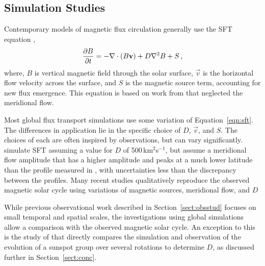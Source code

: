 \subsection{Simulation Studies}

Contemporary models of magnetic flux circulation generally use the \gls{SFT} equation \citep{Devore:1984,Sheeley:1985},
\begin{equation}\label{eqn:sft}
\frac{\partial B}{\partial t}=-\nabla \cdot (B \vec{v}) + D \nabla^2 B + S \mbox{\,,}
\end{equation}
where, $B$ is vertical magnetic field through the solar surface, $\vec{v}$ is the horizontal flow velocity across the surface, and $S$ is the magnetic source term, accounting for new flux emergence. This equation is based on work from \cite{Leighton:1964} that neglected the meridional flow. %

Most global flux transport simulations use some variation of Equation~\ref{eqn:sft}. The differences in application lie in the specific choice of $D$, $\vec{v}$, and $S$. The choices of each are often inspired by observations, but can vary significantly.
\cite{Wang:2009} simulate \gls{SFT} assuming a value for $D$ of 500\,km$^2$s$^{-1}$, but assume a meridional flow amplitude that has a higher amplitude and peaks at a much lower latitude than the profile measured in \cite{Hathaway:2011}, with uncertainties less than the discrepancy between the profiles. 
Many recent studies qualitatively reproduce the observed magnetic solar cycle using variations of magnetic sources, meridional flow, and $D$ \citep{Wang:1989,Dikpati:2004,Schrijver:2008b}

While previous observational work described in Section~\ref{sect:obsstud} focuses on small temporal and spatial scales, the investigations using global simulations allow a comparison with the observed magnetic solar cycle. %
An exception to this is the study of \cite{Wang:1989} that directly compares the simulation and observation of the evolution of a sunspot group over several rotations to determine $D$, as discussed further in Section~\ref{sect:conc}.

